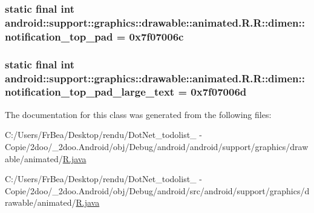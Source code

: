\hypertarget{classandroid_1_1support_1_1graphics_1_1drawable_1_1animated_1_1_r_1_1dimen_12b77c6b014b19d415e5d8aef6a0e9a6}{
\subsubsection[{notification\_\-top\_\-pad}]{\setlength{\rightskip}{0pt plus 5cm}static final int android::support::graphics::drawable::animated.R.R::dimen::notification\_\-top\_\-pad = 0x7f07006c}}
\label{classandroid_1_1support_1_1graphics_1_1drawable_1_1animated_1_1_r_1_1dimen_12b77c6b014b19d415e5d8aef6a0e9a6}


\hypertarget{classandroid_1_1support_1_1graphics_1_1drawable_1_1animated_1_1_r_1_1dimen_a18dec5f2736f1e103c21ef42450d0e5}{
\subsubsection[{notification\_\-top\_\-pad\_\-large\_\-text}]{\setlength{\rightskip}{0pt plus 5cm}static final int android::support::graphics::drawable::animated.R.R::dimen::notification\_\-top\_\-pad\_\-large\_\-text = 0x7f07006d}}
\label{classandroid_1_1support_1_1graphics_1_1drawable_1_1animated_1_1_r_1_1dimen_a18dec5f2736f1e103c21ef42450d0e5}




The documentation for this class was generated from the following files:\begin{CompactItemize}
\item 
C:/Users/FrBea/Desktop/rendu/DotNet\_\-todolist\_ - Copie/2doo/\_\-2doo.Android/obj/Debug/android/android/support/graphics/drawable/animated/\hyperlink{android_2support_2graphics_2drawable_2animated_2_r_8java}{R.java}\item 
C:/Users/FrBea/Desktop/rendu/DotNet\_\-todolist\_ - Copie/2doo/\_\-2doo.Android/obj/Debug/android/src/android/support/graphics/drawable/animated/\hyperlink{src_2android_2support_2graphics_2drawable_2animated_2_r_8java}{R.java}\end{CompactItemize}
